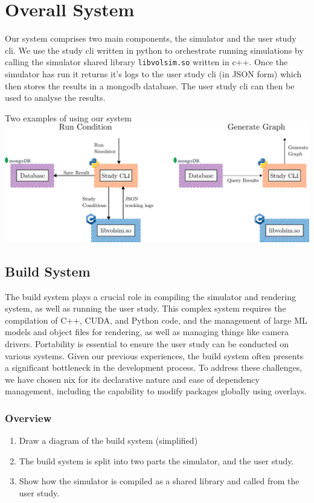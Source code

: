 \section{Overall System}

Our system comprises two main components, the simulator and the user study cli. We use the study cli written in python to orchestrate running simulations by calling the simulator shared library \texttt{libvolsim.so} written in c++. Once the simulator has run it returns it's logs to the user study cli (in JSON form) which then stores the results in a mongodb database. The user study cli can then be used to analyse the results.

\begin{figureBox}[label={fig:System layout}, width=1.0\linewidth]{Two examples of using our system}
    \includegraphics[width = 1.0\linewidth]{./implementation/figures/overall-system.pdf}
\end{figureBox}

\subsection{Build System}

The build system plays a crucial role in compiling the simulator and rendering system, as well as running the user study. This complex system requires the compilation of C++, CUDA, and Python code, and the management of large ML models and object files for rendering, as well as managing things like camera drivers. Portability is essential to ensure the user study can be conducted on various systems. Given our previous experiences, the build system often presents a significant bottleneck in the development process. To address these challenges, we have chosen nix for its declarative nature and ease of dependency management, including the capability to modify packages globally using overlays.

\subsubsection{Overview}
\begin{enumerate}
	\item Draw a diagram of the build system (simplified)
	\item The build system is split into two parts the simulator, and the user study.
	\item Show how the simulator is compiled as a shared library and called from the user study.
\end{enumerate}

